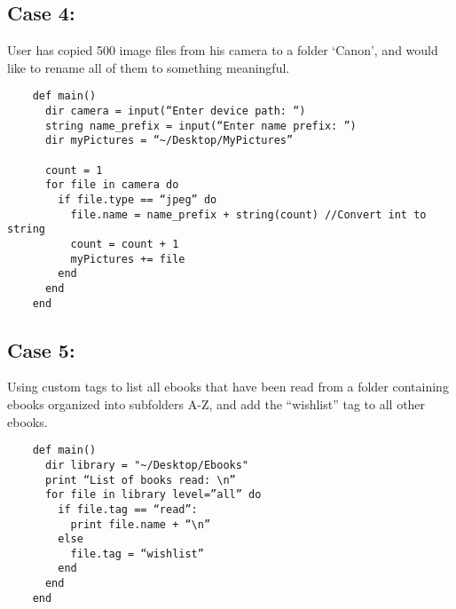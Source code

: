 \documentclass[11pt]{article}
\begin{document}
\subsection{Case 4:}
User has copied 500 image files from his camera to a folder ‘Canon’, and would like to rename all of them to something meaningful.
\begin{listing}[H]
  \begin{verbatim}
    def main()
      dir camera = input(“Enter device path: “)
      string name_prefix = input(“Enter name prefix: ”)
      dir myPictures = “~/Desktop/MyPictures”

      count = 1
      for file in camera do
        if file.type == “jpeg” do
          file.name = name_prefix + string(count) //Convert int to string
          count = count + 1
          myPictures += file
        end
      end
    end
  \end{verbatim}
\end{listing}

\subsection{Case 5:}
Using custom tags to list all ebooks that have been read from a folder containing ebooks organized into subfolders A-Z, and add the “wishlist” tag to all other ebooks.
\begin{listing}[H]
  \begin{verbatim}
    def main()
      dir library = "~/Desktop/Ebooks"
      print “List of books read: \n”
      for file in library level=”all” do
        if file.tag == “read”:
          print file.name + “\n”
        else
          file.tag = “wishlist”
        end
      end
    end
  \end{verbatim}
\end{listing}
\end{document}
